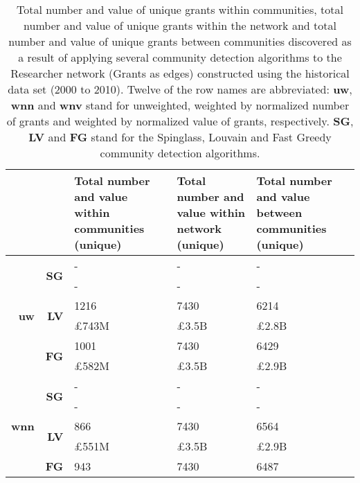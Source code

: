 \begin{table}[!htbp]
\centering
\caption[Total number and value of unique grants within communities, total number and value of unique grants within the network and total number and value of unique grants between communities discovered in the Researcher network (Grants as edges) constructed using the historical data set (2000 to 2010)]{Total number and value of unique grants within communities, total number and value of unique grants within the network and total number and value of unique grants between communities discovered as a result of applying several community detection algorithms to the Researcher network (Grants as edges) constructed using the historical data set (2000 to 2010). Twelve of the row names are abbreviated: \textbf{uw}, \textbf{wnn} and \textbf{wnv} stand for unweighted, weighted by normalized number of grants and weighted by normalized value of grants, respectively. \textbf{SG}, \textbf{LV} and \textbf{FG} stand for the Spinglass, Louvain and Fast Greedy community detection algorithms.}
\label{table:researcher_b_past1_grants2_appendix}
\begin{tabular}{r|r|>{\raggedleft\arraybackslash}p{3.5cm}|>{\raggedleft\arraybackslash}p{3.2cm}|>{\raggedleft\arraybackslash}p{3.5cm}}
\multicolumn{2}{c|}{} & \textbf{Total number and value within communities (unique)} & \textbf{Total number and value within network (unique)} & \textbf{Total number and value between communities (unique)}\\
\hline
\multirow{6}{*}{\textbf{uw}}
& \multirow{2}{*}{\textbf{SG}}
& {-} & {-} & {-}\\
& {} & {-} & {-} & {-}\\
\cline{2-5}
& \multirow{2}{*}{\textbf{LV}}
& {1216} & {7430} & {6214}\\
& {} & {\pounds743M} & {\pounds3.5B} & {\pounds2.8B}\\
\cline{2-5}
& \multirow{2}{*}{\textbf{FG}}
& {1001} & {7430} & {6429}\\
& {} & {\pounds582M} & {\pounds3.5B} & {\pounds2.9B}\\
\hline
\multirow{6}{*}{\textbf{wnn}}
& \multirow{2}{*}{\textbf{SG}}
& {-} & {-} & {-}\\
& {} & {-} & {-} & {-}\\
\cline{2-5}
& \multirow{2}{*}{\textbf{LV}}
& {866} & {7430} & {6564}\\
& {} & {\pounds551M} & {\pounds3.5B} & {\pounds2.9B}\\
\cline{2-5}
& \multirow{2}{*}{\textbf{FG}}
& {943} & {7430} & {6487}\\

\end{tabular}
\end{table}
